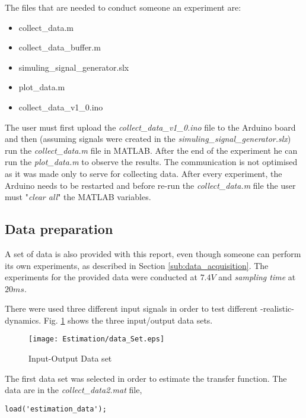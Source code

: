 The files that are needed to conduct someone an experiment are:

\begin{itemize}
	\item collect\_data.m
	\item collect\_data\_buffer.m
	\item simuling\_signal\_generator.slx
	\item plot\_data.m
	\item collect\_data\_v1\_0.ino
\end{itemize} 

The user must first upload the \textit{collect\_data\_v1\_0.ino} file to the Arduino board and then (assuming signals were created in the \textit{simuling\_signal\_generator.slx}) run the \textit{collect\_data.m} file in MATLAB. After the end of the experiment he can run the \textit{plot\_data.m} to observe the results. The communication is not optimised as it was made only to serve for collecting data. After every experiment, the Arduino needs to be restarted and before re-run the \textit{collect\_data.m} file the user must "\textit{clear all}" the MATLAB variables.


\subsection{Data preparation}\label{sub:data_preperation}

A set of data is also provided with this report, even though someone can perform its own experiments, as described in Section \ref{sub:data_acquisition}. The experiments for the provided data were conducted at $7.4V$ and \textit{sampling time} at $20ms$.

There were used three different input signals in order to test different -realistic- dynamics. Fig. \ref{Fig:data_set} shows the three input/output data sets.

\begin{figure}[h!]
	\texttt{[image: Estimation/data\_Set.eps]}
	\caption{Input-Output Data set}
	\label{Fig:data_set}
\end{figure}



The first data set was selected in order to estimate the transfer function. The data are in the \textit{collect\_data2.mat} file,

\begin{lstlisting}[style=My_MATLAB, caption= Load the data]
% Load the input/output data
load('estimation_data');
\end{lstlisting}



